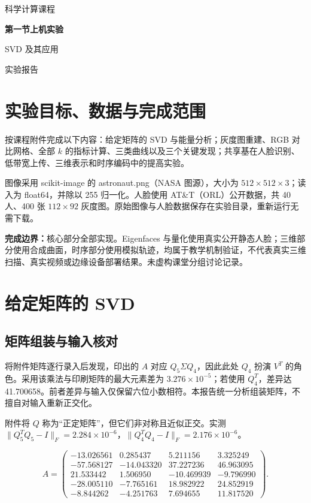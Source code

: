 \documentclass[UTF8,a4paper,11pt,fontset=fandol]{ctexart}
\begin{document}
\hypersetup{pageanchor=false}\begin{titlepage}
\centering\vspace*{22mm}
{\Large 科学计算课程\par}\vspace{12mm}
{\Huge\bfseries 第一节上机实验\par}\vspace{7mm}
{\LARGE SVD 及其应用\par}\vspace{18mm}
{\large 实验报告\par}\vspace{16mm}
\vfill
\end{titlepage}\hypersetup{pageanchor=true}
\tableofcontents\newpage
\section{实验目标、数据与完成范围}
按课程附件完成以下内容：给定矩阵的 SVD 与能量分析；灰度图重建、RGB 对比网格、全部 $k$ 的指标计算、三类曲线以及三个关键发现；共享基在人脸识别、低带宽上传、三维表示和时序编码中的提高实验。

图像采用 scikit-image 的 astronaut.png（NASA 图源），大小为 $512\times512\times3$；读入为 float64，并除以 255 归一化。人脸使用 AT\&T（ORL）公开数据，共 40 人、400 张 $112\times92$ 灰度图。原始图像与人脸数据保存在实验目录，重新运行无需下载。

\textbf{完成边界：}核心部分全部实现。Eigenfaces 与量化使用真实公开静态人脸；三维部分使用合成曲面，时序部分使用模拟轨迹，均属于教学机制验证，不代表真实三维扫描、真实视频或边缘设备部署结果。未虚构课堂分组讨论记录。
\section{给定矩阵的 SVD}
\subsection{矩阵组装与输入核对}
将附件矩阵逐行录入后发现，印出的 $A$ 对应 $Q_5\Sigma Q_4$，因此此处 $Q_4$ 扮演 $V^T$ 的角色。采用该乘法与印刷矩阵的最大元素差为 $3.276\times10^{-5}$；若使用 $Q_4^T$，差异达 41.700658。前者差异与输入仅保留六位小数相符。本报告统一分析组装矩阵，不擅自对输入重新正交化。

附件将 $Q$ 称为“正定矩阵”，但它们非对称且近似正交。实测 $\|Q_5^TQ_5-I\|_F=2.284\times10^{-6}$，$\|Q_4^TQ_4-I\|_F=2.176\times10^{-6}$。


\[A=\begin{pmatrix}-13.026561 & 0.285437 & 5.211156 & 3.325249\\-57.568127 & -14.043320 & 37.227236 & 46.963095\\21.533442 & 1.506950 & -10.469939 & -9.796990\\-28.005110 & -7.765161 & 18.982922 & 24.852919\\-8.844262 & -4.251763 & 7.694655 & 11.817520\end{pmatrix}.\]
\end{document}
